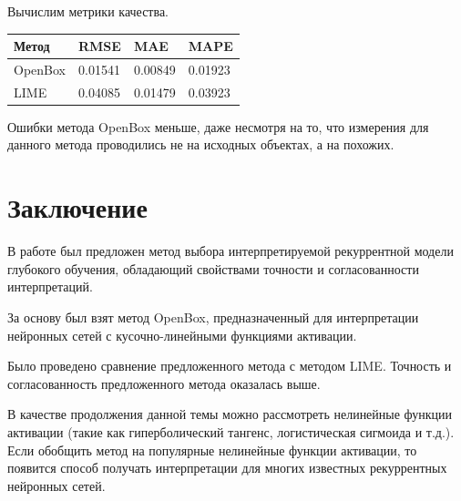 \documentclass[a4paper, 12pt]{article}
\begin{document}
Вычислим метрики качества.

\begin{tabular}{l|l|l|l}
Метод   &   RMSE  &     MAE &    MAPE\\ \hline
OpenBox & 0.01541 & 0.00849 & 0.01923\\ \hline
LIME    & 0.04085 & 0.01479 & 0.03923\\ \hline
\end{tabular}

Ошибки  метода OpenBox меньше, даже несмотря на то, что измерения для данного метода проводились не на исходных объектах, а на похожих.

\section{Заключение}

В работе был предложен метод выбора интерпретируемой рекуррентной модели глубокого обучения, обладающий свойствами точности и согласованности интерпретаций.

За основу был взят метод OpenBox, предназначенный для интерпретации нейронных сетей с кусочно-линейными функциями активации. 

Было проведено сравнение предложенного метода с методом LIME. Точность и согласованность предложенного метода оказалась выше.

В качестве продолжения данной темы можно рассмотреть нелинейные функции активации (такие как гиперболический тангенс, логистическая сигмоида и т.д.). Если обобщить метод на популярные нелинейные функции активации, то появится способ получать интерпретации для многих известных рекуррентных нейронных сетей.



\end{document}
